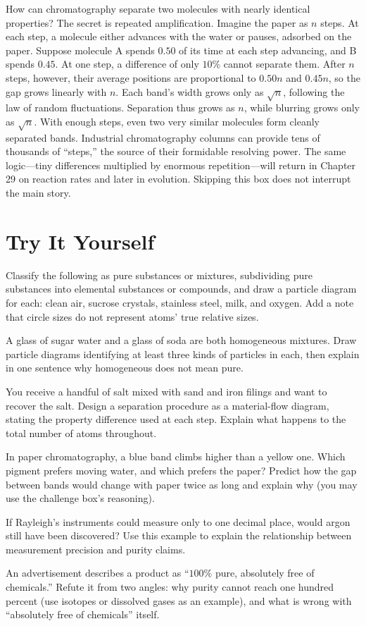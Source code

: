 \begin{tiaozhan}
How can chromatography separate two molecules with nearly identical properties? The secret is repeated amplification. Imagine the paper as $n$ steps. At each step, a molecule either advances with the water or pauses, adsorbed on the paper. Suppose molecule A spends $0.50$ of its time at each step advancing, and B spends $0.45$. At one step, a difference of only $10\%$ cannot separate them. After $n$ steps, however, their average positions are proportional to $0.50n$ and $0.45n$, so the gap grows linearly with $n$. Each band's width grows only as $\sqrt{n}$, following the law of random fluctuations. Separation thus grows as $n$, while blurring grows only as $\sqrt{n}$. With enough steps, even two very similar molecules form cleanly separated bands. Industrial chromatography columns can provide tens of thousands of ``steps,'' the source of their formidable resolving power. The same logic---tiny differences multiplied by enormous repetition---will return in Chapter 29 on reaction rates and later in evolution. Skipping this box does not interrupt the main story.
\end{tiaozhan}

\section*{Try It Yourself}

\begin{sikaoti}
\item Classify the following as pure substances or mixtures, subdividing pure substances into elemental substances or compounds, and draw a particle diagram for each: clean air, sucrose crystals, stainless steel, milk, and oxygen. Add a note that circle sizes do not represent atoms' true relative sizes.
\item A glass of sugar water and a glass of soda are both homogeneous mixtures. Draw particle diagrams identifying at least three kinds of particles in each, then explain in one sentence why homogeneous does not mean pure.
\item You receive a handful of salt mixed with sand and iron filings and want to recover the salt. Design a separation procedure as a material-flow diagram, stating the property difference used at each step. Explain what happens to the total number of atoms throughout.
\item In paper chromatography, a blue band climbs higher than a yellow one. Which pigment prefers moving water, and which prefers the paper? Predict how the gap between bands would change with paper twice as long and explain why (you may use the challenge box's reasoning).
\item If Rayleigh's instruments could measure only to one decimal place, would argon still have been discovered? Use this example to explain the relationship between measurement precision and purity claims.
\item An advertisement describes a product as ``$100\%$ pure, absolutely free of chemicals.'' Refute it from two angles: why purity cannot reach one hundred percent (use isotopes or dissolved gases as an example), and what is wrong with ``absolutely free of chemicals'' itself.
\end{sikaoti}
